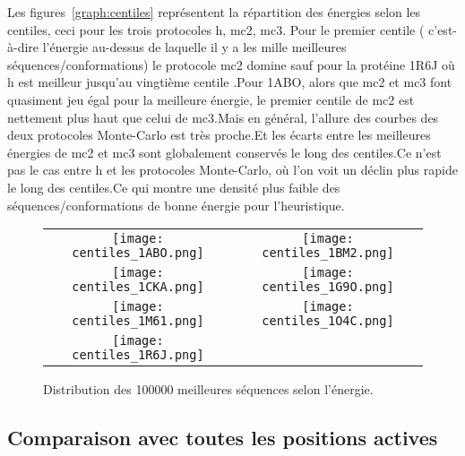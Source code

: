 Les figures~\ref{graph:centiles} représentent la répartition des énergies selon les centiles, ceci pour les trois protocoles h, mc2, mc3. Pour le premier centile  ( c'est-à-dire l'énergie au-dessus de laquelle il y a les mille meilleures séquences/conformations) le protocole mc2 domine sauf pour la protéine 1R6J où h est meilleur jusqu'au vingtième centile .Pour 1ABO, alors que mc2 et mc3 font quasiment jeu égal pour la meilleure énergie, le premier centile de mc2 est nettement plus haut que celui de mc3.Mais en général, l'allure des courbes des deux protocoles Monte-Carlo est très proche.Et les écarts entre  les meilleures énergies de mc2 et mc3 sont globalement conservés le long des centiles.Ce n'est pas le cas entre h et les protocoles Monte-Carlo, où l'on voit un déclin plus rapide le long des centiles.Ce qui montre une densité plus faible des séquences/conformations de bonne énergie pour l'heuristique. 



 



   \begin{figure}[t]
     \centering
     \begin{tabular}{cc}
       \texttt{[image: centiles\_1ABO.png]} &
       \texttt{[image: centiles\_1BM2.png]} \\
       \texttt{[image: centiles\_1CKA.png]} &
       \texttt{[image: centiles\_1G9O.png]} \\
       \texttt{[image: centiles\_1M61.png]} &
       \texttt{[image: centiles\_1O4C.png]} \\
       \texttt{[image: centiles\_1R6J.png]} \\
     \end{tabular}
     
     \caption{Distribution des 100000 meilleures séquences selon l'énergie.}
\label{grah:centiles}
   \end{figure}
 
\clearpage

        \subsection{Comparaison avec toutes les positions actives}

